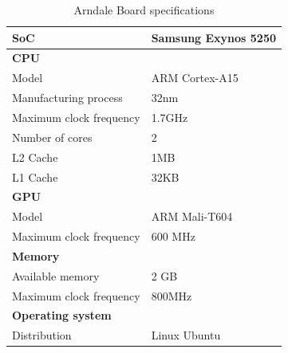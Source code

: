 \begin{table}[h]
  \centering
  \begin{tabular}{ll}
    \toprule
    \textbf{SoC}              & Samsung Exynos 5250 \\
    \midrule
    \textbf{CPU}              &  \\
    Model                     & ARM Cortex-A15 \\
    Manufacturing process     & 32nm \\
    Maximum clock frequency   & 1.7GHz \\
    Number of cores           & 2 \\
    L2 Cache                  & 1MB \\
    L1 Cache                  & 32KB \\
    \midrule
    \textbf{GPU}              &  \\
    Model                     & ARM Mali-T604 \\
    Maximum clock frequency   & 600 MHz \\
    \midrule
    \textbf{Memory}           &  \\
    Available memory          & 2 GB \\
    Maximum clock frequency   & 800MHz \\
    \midrule
    \textbf{Operating system} &  \\
    Distribution              & Linux Ubuntu \\
    \bottomrule
  \end{tabular}
  \caption{Arndale Board specifications\label{arndalespec}}
\end{table}

